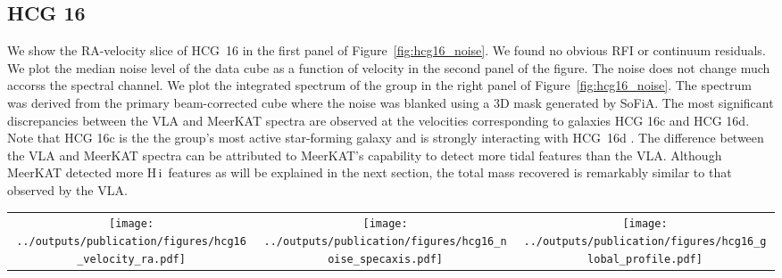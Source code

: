 \documentclass{aa}
\newcommand{\HI}{H\,{\sc i}}
\begin{document}
\subsection{HCG 16}
We show the RA-velocity slice of HCG~16 in the first panel of Figure~\ref{fig:hcg16_noise}. We found no obvious RFI or continuum residuals. 
We plot the median noise level of the data cube as a function of velocity in the second panel of the figure. The noise does not 
change much accorss the spectral channel.  We plot the integrated spectrum of the group in the right panel of Figure~\ref{fig:hcg16_noise}. The spectrum was 
derived from the primary beam-corrected cube where the noise was blanked using a 3D mask generated by SoFiA. 
The most significant discrepancies between the VLA and MeerKAT 
spectra are observed at the velocities corresponding to galaxies HCG 16c and HCG 16d. Note that HCG 16c is the the group's most active 
star-forming galaxy and is strongly interacting with HCG~16d \citep{2023A&A...670A..21J}. The difference between the VLA and MeerKAT 
spectra can be attributed to MeerKAT's capability to detect more tidal features than the VLA. Although MeerKAT detected more \HI\ 
features as will be explained in the next section, the total mass recovered is remarkably similar to that observed by the VLA. 
\begin{figure*}
    \setlength{\tabcolsep}{0pt}
\begin{tabular}{c c c}
    \texttt{[image: ../outputs/publication/figures/hcg16\_velocity\_ra.pdf]} & 
    \texttt{[image: ../outputs/publication/figures/hcg16\_noise\_specaxis.pdf]} &
    \texttt{[image: ../outputs/publication/figures/hcg16\_global\_profile.pdf]} 
  \end{tabular}
  \caption{Left panel: velocity vs right ascension of HCG~16. Middle panel: median noise values of each RA-DEC slice of the non-primary beam corrected \SI{60}{\arcsecond} data cube of 
  HCG~16 as a function of velocity. The horizontal dashed line indicates the median of all the noise values from each slice. Right panel: the blue solid lines indicates the 
  MeerKAT integrated spectrum of HCG~16; the red solid line indicates VLA integrated spectrum of the group derived by \citep{2023A&A...670A..21J}. 
  The vertical dotted lines indicate the velocities of the galaxies in the core of the group. The spectra have been extracted from area containing only genuine \HI\ emission.}  
  \label{fig:hcg16_noise}
 \end{figure*}
\end{document}
